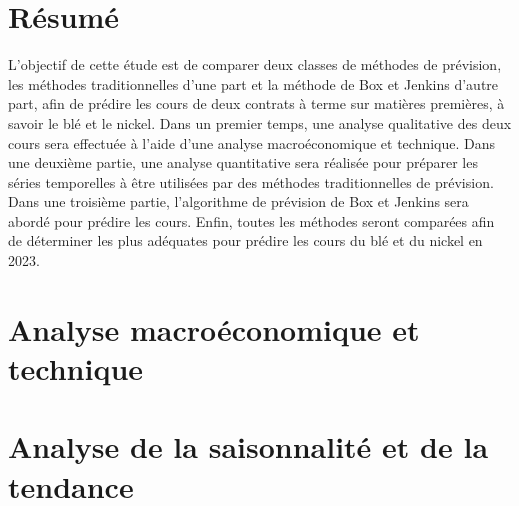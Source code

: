 \documentclass[12pt,a4paper]{article}
\begin{document}
\clearpage
{}



{\centering
\vspace*{\fill}
\section*{Résumé}}
L'objectif de cette étude est de comparer deux classes de méthodes de prévision, les méthodes traditionnelles d'une part et la méthode de Box et Jenkins d'autre part, afin de prédire les cours de deux contrats à terme sur matières premières, à savoir le blé et le nickel. Dans un premier temps, une analyse qualitative des deux cours sera effectuée à l'aide d'une analyse macroéconomique et technique. Dans une deuxième partie, une analyse quantitative sera réalisée pour préparer les séries temporelles à être utilisées par des méthodes traditionnelles de prévision. Dans une troisième partie, l'algorithme de prévision de Box et Jenkins sera abordé pour prédire les cours. Enfin, toutes les méthodes seront comparées afin de déterminer les plus adéquates pour prédire les cours du blé et du nickel en 2023.
\vspace*{\fill}
\clearpage

\pagestyle{fancy}
\fancyhead{}
\fancyfoot{}
\fancyfoot[C]{\thepage}












\appendix
{}
\renewcommand{\thetable}{\thesection.\arabic{table}}
\renewcommand{\thefigure}{\thesection.\arabic{figure}}
\section{Analyse macroéconomique et technique}
\setcounter{table}{0}
\setcounter{figure}{0}

\section{Analyse de la saisonnalité et de la tendance}
\setcounter{table}{0}
\setcounter{figure}{0}
\end{document}
